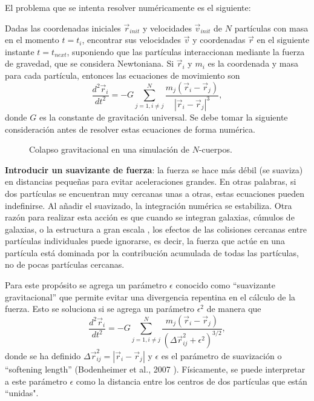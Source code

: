 \documentclass[a4paper,openright,12pt]{book}
\begin{document}
El problema que se intenta resolver numéricamente es el siguiente:

Dadas las coordenadas iniciales $\vec{r}_{init}$ y velocidades $\vec{v}_{init}$ de $N$ partículas con masa en el momento $t = t_{i}$, encontrar sus velocidades $\vec{v}$ y coordenadas $\vec{r}$ en el siguiente instante $t = t_{next}$, suponiendo que las partículas interaccionan mediante la fuerza de gravedad, que se considera Newtoniana. Si $\vec{r}_{i}$ y $m_{i}$ es la coordenada y masa para cada partícula, entonces las ecuaciones de movimiento son
\begin{equation}
\frac{d^{2}\vec{r}_{i}}{d t^{2}}=
-G \sum_{j=1, i \not= j}^{N} \frac{m_{j}(\vec{r}_{i}-\vec{r}_{j})}{|\vec{r}_{i}-\vec{r}_{j}|^{3}}, \label{eqn 2.8}
\end{equation}
donde $G$ es la constante de gravitación universal. Se debe tomar la siguiente consideración antes de resolver estas ecuaciones de forma numérica.

\begin{figure}
\centering
{}
\caption{\footnotesize{Colapso gravitacional en una simulación de $N$-cuerpos.}}
\end{figure}

\textbf{Introducir un suavizante de fuerza}: la fuerza se hace más débil (se suaviza) en distancias pequeñas para evitar aceleraciones grandes. En otras palabras, si dos partículas se encuentran muy cercanas unas a otras, estas ecuaciones pueden indefinirse. Al añadir el suavizado, la integración numérica se estabiliza. Otra razón para realizar esta acción es que cuando se integran galaxias, cúmulos de galaxias, o la estructura a gran escala , los efectos de las colisiones cercanas entre partículas individuales puede ignorarse, es decir, la fuerza que actúe en una partícula está dominada por la contribución acumulada de todas las partículas, no de pocas partículas cercanas.

Para este propósito se agrega un parámetro $\epsilon$ conocido como “suavizante gravitacional” que permite evitar una divergencia repentina en el cálculo de la fuerza. Esto se soluciona si se agrega un parámetro $\epsilon^{2}$ de manera que 
\begin{equation}
\frac{d^{2}\vec{r}_{i}}{d t^{2}}=
-G \sum_{j=1, i \not= j}^{N} \frac{m_{j}(\vec{r}_{i}-\vec{r}_{j})}{(\Delta\vec{r}_{ij}^{2} + \epsilon^{2})^{3/2}},\label{eqn2.7}
\end{equation} 
donde se ha definido $\Delta\vec{r}_{ij}^{2} = |\vec{r}_{i} - \vec{r}_{j}|$ y $\epsilon$ es el parámetro de suavización o “softening length” (Bodenheimer et al., 2007 \cite{b5}). Físicamente, se puede interpretar a este parámetro $\epsilon$ como la distancia entre los centros de dos partículas que están “unidas".
\end{document}
